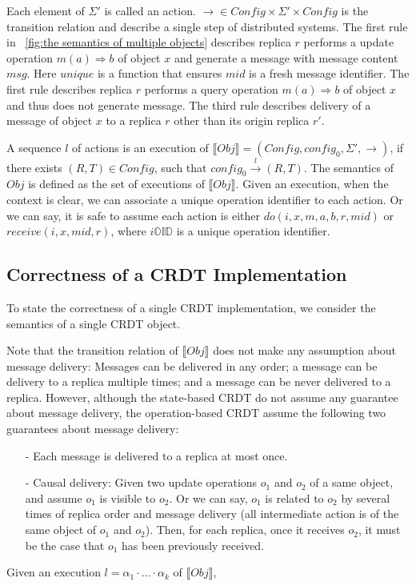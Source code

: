 {Each element of $\Sigma'$ is called an action. $\rightarrow \in \mathit{Config} \times \Sigma' \times \mathit{Config}$ is the transition relation and describe a single step of distributed systems. The first rule in \figurename~\ref{fig:the semantics of multiple objects} describes replica $r$ performs a update operation $m(a) \Rightarrow b$ of object $x$ and generate a message with message content $\mathit{msg}$. Here $\mathit{unique}$ is a function that ensures $\mathit{mid}$ is a fresh message identifier. The first rule  describes replica $r$ performs a query operation $m(a) \Rightarrow b$ of object $x$ and thus does not generate message. The third rule describes delivery of a message of object $x$ to a replica $r$ other than its origin replica $r'$.

A sequence $l$ of actions is an execution of $\llbracket \mathit{Obj} \rrbracket = (\mathit{Config},\mathit{config}_0,\Sigma',\rightarrow)$, if there exists $(R,T) \in \mathit{Config}$, such that $\mathit{config}_0 {\xrightarrow{ l }} (R,T)$. The semantics of $\mathit{Obj}$ is defined as the set of executions of $\llbracket \mathit{Obj} \rrbracket$. Given an execution, when the context is clear, we can associate a unique operation identifier to each action. Or we can say, it is safe to assume each action is either $\mathit{do}(i,x,m,a,b,r,\mathit{mid})$ or $\mathit{receive}(i,x,\mathit{mid},r)$, where $i \mathbb{OID}$ is a unique operation identifier.





\subsection{Correctness of a CRDT Implementation}
\label{subsec:correctness of a CRDT implementation}

To state the correctness of a single CRDT implementation, we consider the semantics of a single CRDT object.



Note that the transition relation of $\llbracket \mathit{Obj} \rrbracket$ does not make any assumption about message delivery: Messages can be delivered in any order; a message can be delivery to a replica multiple times; and a message can be never delivered to a replica. However, although the state-based CRDT do not assume any guarantee about message delivery, the operation-based CRDT assume the following two guarantees about message delivery:

\begin{itemize}
\setlength{\itemsep}{0.5pt}
\item[-] Each message is delivered to a replica at most once.
\item[-] Causal delivery: Given two update operations $o_1$ and $o_2$ of a same object, and assume $o_1$ is visible to $o_2$. Or we can say, $o_1$ is related to $o_2$ by several times of replica order and message delivery (all intermediate action is of the same object of $o_1$ and $o_2$). Then, for each replica, once it receives $o_2$, it must be the case that $o_1$ has been previously received.
\end{itemize}

Given an execution $l = \alpha_1 \cdot \ldots \cdot \alpha_k$ of $\llbracket \mathit{Obj} \rrbracket$,
}

